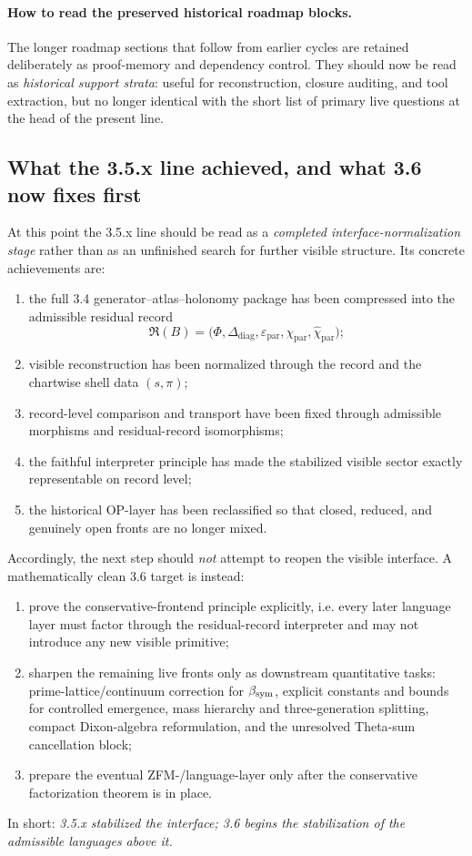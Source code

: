 \paragraph{How to read the preserved historical roadmap blocks.}
The longer roadmap sections that follow from earlier cycles are retained deliberately as proof-memory and dependency control. They should now be read as \emph{historical support strata}: useful for reconstruction, closure auditing, and tool extraction, but no longer identical with the short list of primary live questions at the head of the present line.

\subsection*{What the 3.5.x line achieved, and what 3.6 now fixes first}
At this point the 3.5.x line should be read as a \emph{completed interface-normalization stage} rather than as an unfinished search for further visible structure.
Its concrete achievements are:
\begin{enumerate}[leftmargin=2em]
  \item the full 3.4 generator--atlas--holonomy package has been compressed into the admissible residual record
  \[
  \mathfrak R(B)=\bigl(\Phi,\Delta_{\mathrm{diag}},\varepsilon_{\mathrm{par}},\chi_{\mathrm{par}},\widehat\chi_{\mathrm{par}}\bigr);
  \]
  \item visible reconstruction has been normalized through the record and the chartwise shell data \((s,\pi)\);
  \item record-level comparison and transport have been fixed through admissible morphisms and residual-record isomorphisms;
  \item the faithful interpreter principle has made the stabilized visible sector exactly representable on record level;
  \item the historical OP-layer has been reclassified so that closed, reduced, and genuinely open fronts are no longer mixed.
\end{enumerate}
Accordingly, the next step should \emph{not} attempt to reopen the visible interface.
A mathematically clean 3.6 target is instead:
\begin{enumerate}[leftmargin=2em,label=(\roman*)]
  \item prove the conservative-frontend principle explicitly, i.e. every later language layer must factor through the residual-record interpreter and may not introduce any new visible primitive;
  \item sharpen the remaining live fronts only as downstream quantitative tasks: prime-lattice/continuum correction for \(\beta_{\mathrm{sym}}\), explicit constants and bounds for controlled emergence, mass hierarchy and three-generation splitting, compact Dixon-algebra reformulation, and the unresolved Theta-sum cancellation block;
  \item prepare the eventual ZFM-/language-layer only after the conservative factorization theorem is in place.
\end{enumerate}
In short: \emph{3.5.x stabilized the interface; 3.6 begins the stabilization of the admissible languages above it.}

